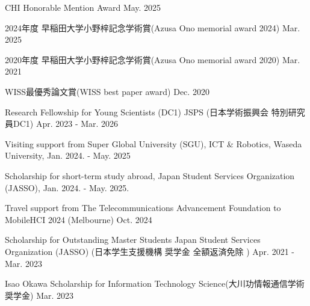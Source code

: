 

\begin{cvhonors}

  \cvhonor
    {CHI Honorable Mention Award}
    {}
    {}
    {May. 2025}

  \cvhonor
    {{\jpfont 2024年度 早稲田大学小野梓記念学術賞(Azusa Ono memorial award 2024)}}
    {}
    {}
    {Mar. 2025}

  \cvhonor
    {{\jpfont 2020年度 早稲田大学小野梓記念学術賞(Azusa Ono memorial award 2020)}}
    {}
    {}
    {Mar. 2021}

  \cvhonor
    {{\jpfont WISS最優秀論文賞(WISS best paper award)}}
    {}
    {}
    {Dec. 2020}

\end{cvhonors}


\begin{cvhonors}

  \cvhonor
    {{\jpfont Research Fellowship for Young Scientists (DC1) JSPS (日本学術振興会 特別研究員DC1)}}
    {}
    {}
    {Apr. 2023 - Mar. 2026}

  \cvhonor
    {Visiting support from Super Global University (SGU), ICT \& Robotics, Waseda University,}
    {}
    {}
    {Jan. 2024. - May. 2025}

  \cvhonor
    {Scholarship for short-term study abroad, Japan Student Services Organization (JASSO),}
    {}
    {}
    {Jan. 2024. - May. 2025.}

  \cvhonor
    {Travel support from The Telecommunications Advancement Foundation to MobileHCI 2024 (Melbourne)}
    {}
    {}
    {Oct. 2024}

  \cvhonor
    {{\jpfont Scholarship for Outstanding Master Students Japan Student Services Organization (JASSO) (日本学生支援機構 奨学金 全額返済免除 )}}
    {}
    {}
    {Apr. 2021 - Mar. 2023}

  \cvhonor
    {{\jpfont Isao Okawa Scholarship for Information Technology Science(大川功情報通信学術奨学金)}}
    {}
    {}
    {Mar. 2023}

\end{cvhonors}
